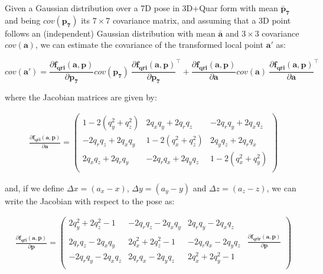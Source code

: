 \documentclass[a4paper,11pt]{report}
\begin{document}
Given a Gaussian distribution over a 7D pose in 3D+Quar form with
mean $\mathbf{\bar{p}_7}$ and being $cov(\mathbf{p_7})$ its $7 \times 7$ covariance matrix,
and assuming that a 3D point follows an (independent) Gaussian distribution
with mean $\mathbf{\bar{a}}$ and $3 \times 3$ covariance $cov(\mathbf{a})$,
we can estimate the covariance of the transformed local point $\mathbf{a'}$
as:

\begin{equation}
cov(\mathbf{a'}) =
\frac{\partial \mathbf{f_{qri}}( \mathbf{a}, \mathbf{p} )}{\partial \mathbf{p_7}}
cov(\mathbf{p_7})  ~
\frac{\partial \mathbf{f_{qri}}( \mathbf{a}, \mathbf{p} )}{\partial \mathbf{p_7}}^\top
+
\frac{\partial \mathbf{f_{qri}}( \mathbf{a}, \mathbf{p} )}{\partial \mathbf{a}}
cov(\mathbf{a})  ~
\frac{\partial \mathbf{f_{qri}}( \mathbf{a}, \mathbf{p} )}{\partial \mathbf{a}}^\top
\end{equation}

\noindent where the Jacobian matrices are given by:

\begin{eqnarray}
\frac{ \partial \mathbf{f_{qri}}( \mathbf{a}, \mathbf{p} )}{\partial \mathbf{a}} =
\left(\begin{array}{ccc}
1 - 2 (q_y^2 + q_z^2)   &    2 q_x q_y + 2 q_r q_z  &     - 2 q_r q_y + 2 q_x q_z \\
-2 q_r q_z + 2 q_x q_y &   1 - 2 (q_x^2 + q_z^2) &   2 q_y q_z + 2 q_r q_x \\
2 q_x q_z + 2 q_r q_y &   -2 q_r q_x + 2 q_y q_z & 1 - 2 (q_x^2 + q_y^2 ) \\
\end{array}\right)
\end{eqnarray}

\noindent and, if we define
$\Delta x = (a_x - x)$, $\Delta y = (a_y - y)$ and $\Delta z = (a_z - z)$, we can
write the Jacobian with respect to the pose as:

\begin{eqnarray}
\label{eq:df_qri_p}
\frac{ \partial \mathbf{f_{qri}}( \mathbf{a}, \mathbf{p} )}{\partial \mathbf{p}} =
\left(\begin{array}{ccc|c}
2 q_y^2 + 2 q_z^2 - 1 &   -2 q_r q_z - 2 q_x q_y &  2 q_r q_y - 2 q_x q_z &  ~
\\
2 q_r q_z - 2 q_x q_y &  2 q_x^2 + 2 q_z^2 - 1   &  -2 q_r q_x - 2 q_y q_z &
  \frac{ \partial \mathbf{f_{qrir}}( \mathbf{a}, \mathbf{p} )}{\partial \mathbf{p}}
\\
-2 q_r q_y - 2 q_x q_z &  2 q_r q_x - 2 q_y q_z &  2 q_x^2 + 2 q_y^2 - 1 & ~
\\
\end{array}\right)
\end{eqnarray}
\end{document}
